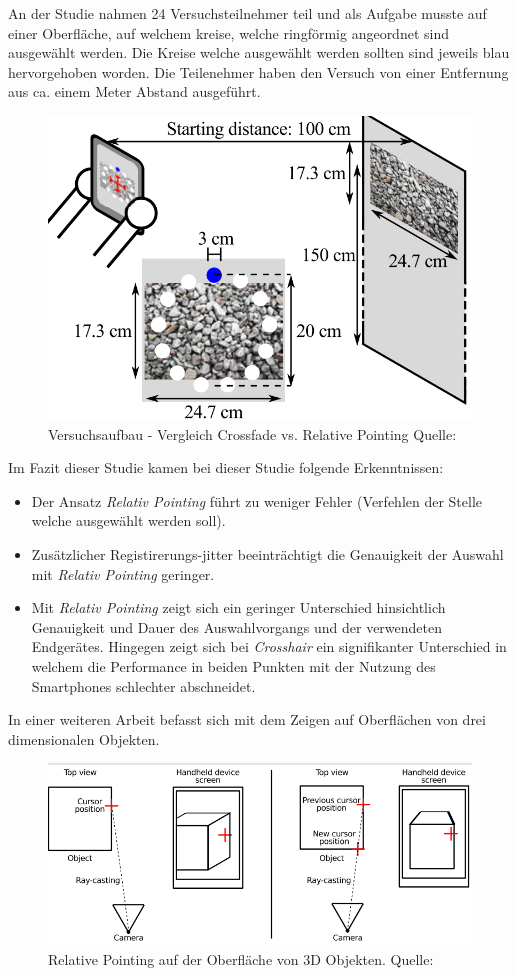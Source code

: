 An der Studie nahmen 24 Versuchsteilnehmer teil und als Aufgabe musste auf einer Oberfläche, auf welchem kreise, welche ringförmig angeordnet sind ausgewählt werden. Die Kreise 
welche ausgewählt werden sollten sind jeweils blau hervorgehoben worden. Die Teilenehmer haben den Versuch von einer Entfernung aus ca. einem Meter Abstand ausgeführt. 

\begin{figure}[H]
	\centering
	\includegraphics[width=.5\textwidth]{resources/analyse/versuchsaufbau.png}
	\caption{Versuchsaufbau - Vergleich Crossfade vs. Relative Pointing Quelle: \cite{Vincent2013}}
	\label{img:versuchsaufbau}
\end{figure}

Im Fazit dieser Studie kamen bei dieser Studie folgende Erkenntnissen: 

\begin{itemize}
\item{Der Ansatz \textit{Relativ Pointing} führt zu weniger Fehler (Verfehlen der Stelle welche ausgewählt werden soll).}
\item{Zusätzlicher Registirerungs-jitter beeinträchtigt die Genauigkeit der Auswahl mit \textit{Relativ Pointing} geringer.}
\item{Mit \textit{Relativ Pointing} zeigt sich ein geringer Unterschied hinsichtlich Genauigkeit und Dauer des Auswahlvorgangs und der verwendeten Endgerätes. Hingegen zeigt sich bei \textit{Crosshair} ein signifikanter Unterschied in welchem die Performance in beiden Punkten mit der Nutzung des Smartphones schlechter abschneidet.}
\end{itemize}

In einer weiteren Arbeit befasst sich \citeauthor{Vincent2014} mit dem Zeigen auf Oberflächen von drei dimensionalen Objekten. \cite[S.~92]{Vincent2014}

\begin{figure}[H]
	\centering
	\includegraphics[width=.7\textwidth]{resources/analyse/pointing_3d.png}
	\caption{Relative Pointing auf der Oberfläche von 3D Objekten. Quelle: \cite[S.~84]{Vincent2014}}
	\label{img:pointing_auf3d}
\end{figure}

